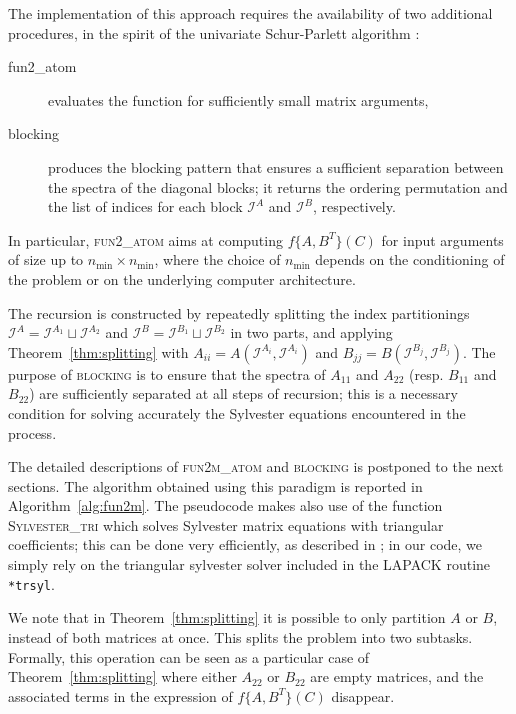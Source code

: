 \documentclass{siamart1116}
\begin{document}
The implementation of this approach requires
the availability of two additional procedures, in the
 spirit of the univariate Schur-Parlett algorithm 
 \cite{davies2003schur}:
\begin{description}
	\item[\sc fun2\_atom]  evaluates the function for sufficiently small matrix arguments,
	\item[\sc blocking] produces the blocking pattern that ensures a sufficient separation between the spectra of the diagonal blocks; it returns the ordering permutation and the list of indices for each block
	$\mathcal I^A$ and $\mathcal I^B$, respectively.
	\end{description}
In particular, \textsc{fun2\_atom} aims at computing 
$f\{A,B^T\}(C)$ for input arguments of size up to 
$n_{\min}\times n_{\min}$, where the choice of 
$n_{\min}$ depends on the conditioning of the problem 
or on the underlying computer architecture. 

The recursion is constructed by repeatedly splitting the index
partitionings $\mathcal I^A = \mathcal I^{A_1} \sqcup \mathcal I^{A_2}$ 
and $\mathcal I^B = \mathcal I^{B_1} \sqcup \mathcal I^{B_2}$ in two parts, and 
applying Theorem~\ref{thm:splitting} with $A_{ii} = A(\mathcal I^{A_i}, \mathcal I^{A_i})$ and $B_{jj} = B(\mathcal I^{B_j}, \mathcal I^{B_j})$.
The purpose of \textsc{blocking} is to ensure that the spectra of $A_{11}$ and $A_{22}$ (resp. $B_{11}$ and $B_{22}$) are sufficiently separated
at all steps of recursion; this is a necessary condition for solving accurately the Sylvester equations encountered in the process.

The detailed descriptions of \textsc{fun2m\_atom} 
and \textsc{blocking} is postponed to the next sections. 
The algorithm obtained using this paradigm is reported 
in Algorithm~\ref{alg:fun2m}. The pseudocode makes also
use of the function \textsc{Sylvester\_tri} which solves
Sylvester matrix equations with triangular coefficients; 
this can be done very efficiently, as described in 
\cite{jonsson2002recursive}; in our code, we simply rely on the 
triangular sylvester solver included in the LAPACK routine 
\texttt{*trsyl}. 

\begin{remark}
	We note that in Theorem~\ref{thm:splitting} it is possible to only partition $A$ or $B$, 
	instead of both matrices at once. This splits the problem into two subtasks. Formally, this 
	operation can be seen as a particular case of Theorem~\ref{thm:splitting} where either 
	$A_{22}$ or $B_{22}$ are empty matrices, and the associated terms in the expression of 
	$f\{A, B^T\}(C)$ disappear. 
\end{remark}
\end{document}
